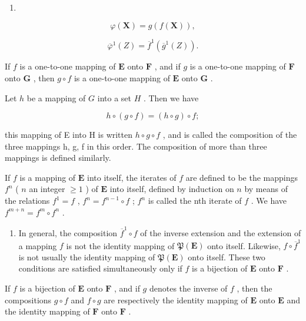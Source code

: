 \begin{enumerate}
\def\labelenumi{(\arabic{enumi})}
\setcounter{enumi}{19}
\tightlist
\item
\end{enumerate}

\[
\varphi (\mathbf {X}) = g (f (\mathbf {X})),\tag{21}
\]

\[
\overline {{{\varphi}}} ^ {1} (Z) = \overline {{{f}}} ^ {1} (\overline {{{g}}} ^ {1} (Z)).
\]

If \(f\) is a one-to-one mapping of \(\mathbf{E}\) onto \(\mathbf{F}\) , and if \(g\) is a one-to-one mapping of \(\mathbf{F}\) onto \(\mathbf{G}\) , then \(g \circ f\) is a one-to-one mapping of \(\mathbf{E}\) onto \(\mathbf{G}\) .

Let \(h\) be a mapping of \(G\) into a set \(H\) . Then we have

\[
h \circ (g \circ f) = (h \circ g) \circ f;
\]

this mapping of E into H is written \(h \circ g \circ f\) , and is called the composition of the three mappings h, g, f in this order. The composition of more than three mappings is defined similarly.

If \(f\) is a mapping of \(\mathbf{E}\) into itself, the iterates of \(f\) are defined to be the mappings \(f^n\) ( \(n\) an integer \(\geqslant 1\) ) of \(\mathbf{E}\) into itself, defined by induction on \(n\) by means of the relations \(f^1 = f\) , \(f^n = f^{n-1} \circ f\) ; \(f^n\) is called the nth iterate of \(f\) . We have \(f^{m+n} = f^m \circ f^n\) .

\begin{enumerate}
\def\labelenumi{\arabic{enumi}.}
\setcounter{enumi}{11}
\tightlist
\item
  In general, the composition \(\overline{f}^{1} \circ f\) of the inverse extension and the extension of a mapping \(f\) is not the identity mapping of \(\mathfrak{P}(\mathbf{E})\) onto itself. Likewise, \(f \circ \overline{f}^1\) is not usually the identity mapping of \(\mathfrak{P}(\mathbf{E})\) onto itself. These two conditions are satisfied simultaneously only if \(f\) is a bijection of \(\mathbf{E}\) onto \(\mathbf{F}\) .
\end{enumerate}

If \(f\) is a bijection of \(\mathbf{E}\) onto \(\mathbf{F}\) , and if \(g\) denotes the inverse of \(f\) , then the compositions \(g \circ f\) and \(f \circ g\) are respectively the identity mapping of \(\mathbf{E}\) onto \(\mathbf{E}\) and the identity mapping of \(\mathbf{F}\) onto \(\mathbf{F}\) .

